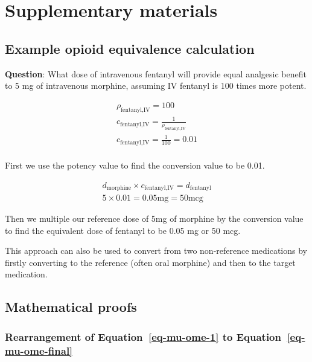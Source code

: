 \documentclass[
  letterpaper,
  DIV=11,
  numbers=noendperiod]{scrreprt}
\begin{document}
\chapter{Supplementary materials}\label{supplementary-materials}

\section{Example opioid equivalence
calculation}\label{sec-conversion-example}

\textbf{Question}: What dose of intravenous fentanyl will provide equal
analgesic benefit to 5 mg of intravenous morphine, assuming IV fentanyl
is 100 times more potent.

\[\begin{align}
\rho_{\text{fentanyl,IV}} = 100 \\
c_{\text{fentanyl,IV}} = \frac{1}{\rho_{\text{fentanyl,IV}}} \\
c_{\text{fentanyl,IV}} = \frac{1}{100} = 0.01 \\
\end{align}\]

First we use the potency value to find the conversion value to be 0.01.

\[\begin{align}
d_{\text{morphine}} \times c_{\text{fentanyl,IV}} = d_{\text{fentanyl}} \\
5 \times 0.01 = 0.05\text{mg} = 50\text{mcg}
\end{align}\]

Then we multiple our reference dose of 5mg of morphine by the conversion
value to find the equivalent dose of fentanyl to be 0.05 mg or 50 mcg.

This approach can also be used to convert from two non-reference
medications by firstly converting to the reference (often oral morphine)
and then to the target medication.

\section{Mathematical proofs}\label{mathematical-proofs}

\subsection{\texorpdfstring{Rearrangement of Equation~\ref{eq-mu-ome-1}
to
Equation~\ref{eq-mu-ome-final}}{Rearrangement of Equation~ to Equation~}}\label{sec-equation-proof}
\end{document}
